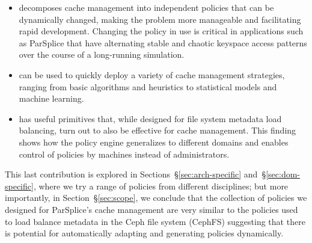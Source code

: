 \begin{itemize}

  \item decomposes cache management into independent policies that can be
  dynamically changed, making the problem more manageable and facilitating rapid
  development. Changing the policy in use is critical in applications such as
  ParSplice that have alternating stable and chaotic keyspace access patterns
  over the course of a long-running simulation.  

  \item can be used to quickly deploy a variety of cache management strategies,
  ranging from basic algorithms and heuristics to statistical models and machine
  learning. 

  \item has useful primitives that, while designed for file system metadata
  load balancing, turn out to also be effective for cache management. This
  finding shows how the policy engine generalizes to different domains and
  enables control of policies by machines instead of administrators.

\end{itemize}


This last contribution is explored in Sections~\S\ref{sec:arch-specific}
and~\S\ref{sec:dom-specific}, where we try a range of policies from different
disciplines; but more importantly, in Section~\S\ref{sec:scope}, we conclude
that the collection of policies we designed for ParSplice's cache management
are very similar to the policies used to load balance metadata in the Ceph file
system (CephFS) suggesting that there is potential for automatically adapting
and generating policies dynamically. 


